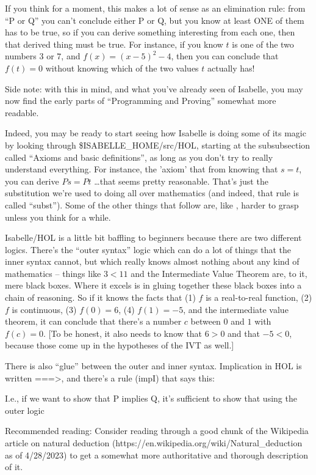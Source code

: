 If you think for a moment, this makes a lot of sense as an elimination rule: from ``P or Q'' you can't conclude either P or Q, but you know at least ONE of them has to be true, so if you can derive something interesting from each one, then that derived thing must be true. For instance, if you know $t$ is one of the two numbers $3$ or $7$, and $f(x) = (x-5)^2 - 4$, then you can conclude that $f(t) = 0$ without knowing which of the two values $t$ actually has!

Side note: with this in mind, and what you've already seen of Isabelle, you may now find the early parts of ``Programming and Proving'' somewhat more readable.

Indeed, you may be ready to start seeing how Isabelle is doing some of its magic by looking through \$ISABELLE\_HOME/src/HOL, starting at the subsubsection called ``Axioms and basic definitions'', as long as you don't try to really understand everything. For instance, the 'axiom' that from knowing that $s = t$, you can derive $P s = P t$ \ldots  that seems pretty reasonable. That's just the substitution we're used to doing all over mathematics (and indeed, that rule is called ``subst''). Some of the other things that follow are, like , harder to grasp unless you think for a while. 

Isabelle/HOL is a little bit baffling to beginners because there are two different logics. There's the ``outer syntax'' logic which can do a lot of things that the inner syntax cannot, but which really knows almost nothing about any kind of mathematics -- things like $3 < 11$ and the Intermediate Value Theorem are, to it, mere black boxes. Where it excels is in gluing together these black boxes into a chain of reasoning. So if it knows the facts that (1) $f$ is a real-to-real function, (2) $f$ is continuous, (3) $f(0) = 6$, (4) $f(1) = -5$, and the intermediate value theorem, it can conclude that there's a number $c$ between $0$ and $1$ with $f(c) = 0$. [To be honest, it also needs to know that $6 > 0$ and that $-5 < 0$, because those come up in the hypotheses of the IVT as well.] 

There is also ``glue'' between the outer and inner syntax. Implication in HOL is written ===>, and there's a rule (impI) that says this:

I.e., if we want to show that P implies Q, it's sufficient to show that using the outer logic

Recommended reading: Consider reading through a good chunk of the Wikipedia article on natural deduction (https://en.wikipedia.org/wiki/Natural\_deduction as of 4/28/2023) to get a somewhat more authoritative and thorough description of it. 

